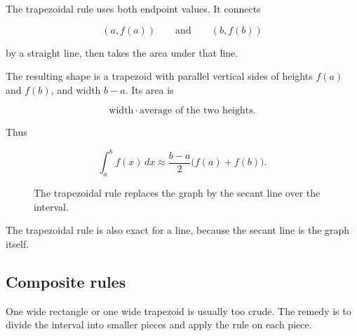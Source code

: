 The trapezoidal rule uses both endpoint values.  It connects

\[
(a,f(a))
\qquad\text{and}\qquad
(b,f(b))
\]

by a straight line, then takes the area under that line.

The resulting shape is a trapezoid with parallel vertical sides of heights \(f(a)\) and
\(f(b)\), and width \(b-a\).  Its area is

\[
\text{width}\cdot\text{average of the two heights}.
\]

Thus

\[
\boxed{
\int_a^b f(x)\,dx\approx
\frac{b-a}{2}\bigl(f(a)+f(b)\bigr).
}
\]

\begin{figure}[h]
\centering
{}
\caption{The trapezoidal rule replaces the graph by the secant line over the interval.}
\label{fig:trapezoid-single-interval}
\end{figure}

The trapezoidal rule is also exact for a line, because the secant line is the graph itself.

\subsection{Composite rules}
\label{subsec:composite-midpoint-trapezoidal-rules}

One wide rectangle or one wide trapezoid is usually too crude.  The remedy is to divide
the interval into smaller pieces and apply the rule on each piece.

